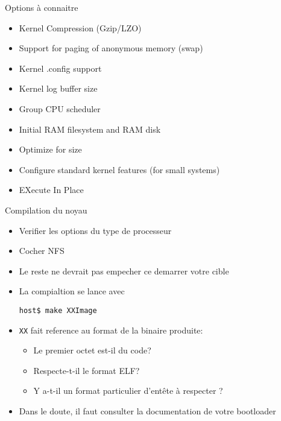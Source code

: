\begin{frame}[fragile=singleslide]{Options à connaitre}
  \begin{itemize}
  \item Kernel Compression (Gzip/LZO)
  \item Support for paging of anonymous memory (swap)
  \item Kernel .config support
  \item Kernel log buffer size
  \item Group CPU scheduler
  \item Initial RAM filesystem and RAM disk
  \item Optimize for size
  \item Configure standard kernel features (for small systems)
  \item EXecute In Place
  \end{itemize}
\end{frame}

\begin{frame}[fragile=singleslide]{Compilation du noyau}
  \begin{itemize}
  \item Verifier les options du type de processeur
  \item Cocher NFS
  \item Le reste ne devrait pas empecher ce demarrer votre cible
  \item La compialtion se lance avec
    \begin{lstlisting}
host$ make XXImage
    \end{lstlisting}
  \item \verb+XX+ fait reference au format de la binaire produite:
    \begin{itemize}
    \item Le premier octet est-il du code?
    \item Respecte-t-il le format ELF?
    \item Y a-t-il un format particulier d'entête à respecter ?
    \end{itemize}
  \item Dans  le doute,  il faut consulter  la documentation  de votre
    bootloader
  \end{itemize}
\end{frame}  

